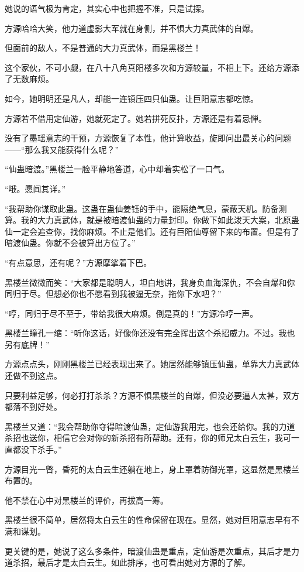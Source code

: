 \begin{this_body}
她说的语气极为肯定，其实心中也把握不准，只是试探。

方源哈哈大笑，他力道虚影大军就在身侧，并不惧大力真武体的自爆。

但面前的敌人，不是普通的大力真武体，而是黑楼兰！

这个家伙，不可小觑，在八十八角真阳楼多次和方源较量，不相上下。还给方源添了无数麻烦。

如今，她明明还是凡人，却能一连镇压四只仙蛊。让巨阳意志都吃惊。

方源若不借用定仙游，她就死定了。她若拼死反扑，方源还是有着忌惮。

没有了墨瑶意志的干预，方源恢复了本性，他计算收益，旋即问出最关心的问题——“那么我又能获得什么呢？”

“仙蛊暗渡。”黑楼兰一脸平静地答道，心中却着实松了一口气。

“哦。愿闻其详。”

“我帮助你谋取此蛊。这蛊在蛊仙姜钰的手中，能隔绝气息，蒙蔽天机。防备测算。我的大力真武体，就是被暗渡仙蛊的力量封印。你做下如此泼天大案，北原蛊仙一定会追查你，找你麻烦。不止是他们。还有巨阳仙尊留下来的布置。但是有了暗渡仙蛊。你就不会被算出方位了。”

“有点意思，还有呢？”方源摩挲着下巴。

黑楼兰微微而笑：“大家都是聪明人，坦白地讲，我身负血海深仇，不会自爆和你同归于尽。但想必你也不愿看到我被逼无奈，拖你下水吧？”

“哼，同归于尽不至于，带给我很大麻烦。倒是真的！”方源冷哼一声。

黑楼兰瞳孔一缩：“听你这话，好像你还没有完全挥出这个杀招威力。不过。我也另有底牌！”

方源点点头，刚刚黑楼兰已经表现出来了。她居然能够镇压仙蛊，单靠大力真武体还做不到这点。

只要利益足够，何必打打杀杀？方源不惧黑楼兰的自爆，但没必要逼人太甚，双方都落不到好处。

黑楼兰又道：“我会帮助你夺得暗渡仙蛊，定仙游我用完，也会还给你。我的力道杀招也送你，相信它会对你的新杀招有所帮助。还有，你的师兄太白云生，我可一直都没下杀手。”

方源目光一瞥，昏死的太白云生还躺在地上，身上罩着防御光罩，这显然是黑楼兰布置的。

他不禁在心中对黑楼兰的评价，再拔高一筹。

黑楼兰很不简单，居然将太白云生的性命保留在现在。显然，她对巨阳意志早有不满和谋划。

更关键的是，她说了这么多条件，暗渡仙蛊是重点，定仙游是次重点，其后才是力道杀招，最后才是太白云生。如此排序，也可看出她对方源的了解。


\end{this_body}
